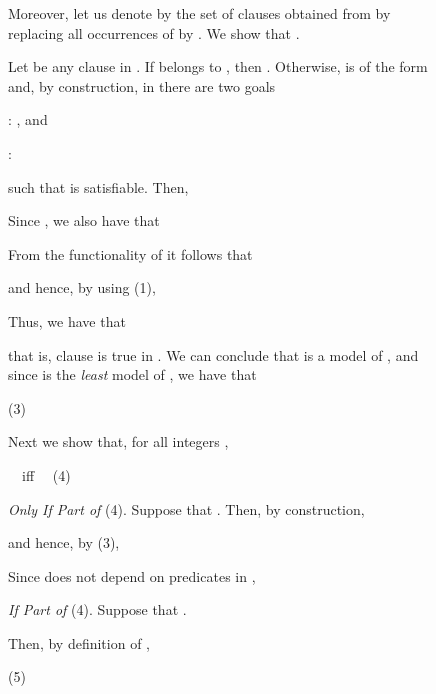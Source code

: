 \documentclass[english]{tlp}
\begin{document}
\begin{figure}[ht]
\begin{flushleft}
\begin{minipage}{124mm}
\noindent
Moreover,  let us denote by  the set of clauses obtained from  by replacing all occurrences of  by .
We show that  .

\noindent
Let   be any clause in . If  belongs to  , then .
Otherwise,  is of the form  and, by construction,  in 
there are two goals

\smallskip
: ,
and 

:  

\smallskip
\noindent
such that  is satisfiable.
Then, 

\smallskip


\smallskip
\noindent
Since , we also have that

\smallskip


\smallskip
\noindent
From the functionality of  it follows that 

\smallskip
 

\hfill


\smallskip
\noindent
 and hence, by using (1), 

\smallskip


\smallskip
\noindent
Thus, we have that 

\smallskip


\smallskip
\noindent
that is, clause
 is true in .
We can conclude that  is a model of
, and since  is the {\it least} model of , we have that

\smallskip
 \hfill (3)

\smallskip
\noindent
Next we show that,  for all integers ,

\smallskip

  
\ \ iff  \ \
 \hfill (4)

\smallskip\noindent
{\it Only If Part of} (4).
Suppose  that
. Then, by 
construction,

\smallskip



\smallskip

\noindent
and hence, by (3),

\smallskip

 

\smallskip

\noindent
Since  does not depend on predicates in ,

\smallskip




\medskip

\noindent
{\it If Part of} (4). 
Suppose that
.

\noindent
Then, by definition of  ,

\smallskip
 \hfill (5)


\end{minipage}
\end{flushleft}
\end{figure}
\end{document}
